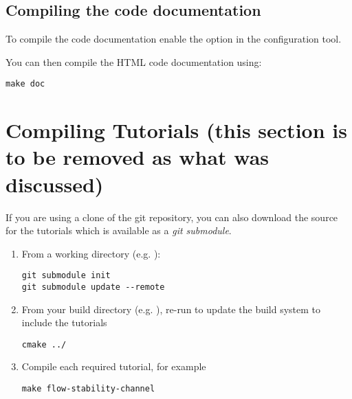 \subsection{Compiling the code documentation}
To compile the code documentation enable the  option
in the  configuration tool.

You can then compile the HTML code documentation using:
\begin{lstlisting}[style=BashInputStyle]
make doc
\end{lstlisting}


\section{Compiling Tutorials (this section is to be removed as what was discussed)}
If you are using a clone of the \nekpp git repository, you can also download
the source for the \nekpp tutorials which is available as a \emph{git submodule}.

\begin{enumerate}
\item From a \nekpp working directory (e.g. ):
\begin{lstlisting}[style=BashInputStyle]
git submodule init
git submodule update --remote
\end{lstlisting}
\item From your build directory (e.g. ), re-run  to update the build system to include the tutorials
\begin{lstlisting}[style=BashInputStyle]
cmake ../
\end{lstlisting}
\item Compile each required tutorial, for example
\begin{lstlisting}[style=BashInputStyle]
make flow-stability-channel
\end{lstlisting}
\end{enumerate}
